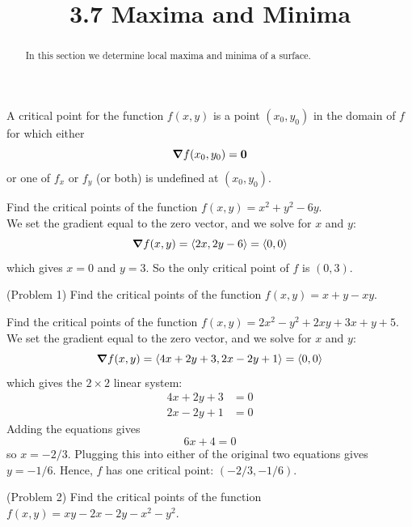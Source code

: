 \documentclass[handout]{ximera}
\title{3.7 Maxima and Minima}
\begin{document}
\begin{abstract}
In this section we determine local maxima and minima of a surface.
\end{abstract}

\maketitle

\begin{definition}
A critical point for the function $f(x,y)$ is a point $(x_0, y_0)$ in the domain of $f$ for which either
\[
\boldsymbol\nabla f(x_0, y_0) = \mathbf 0
\]
or one of $f_x$ or $f_y$ (or both) is undefined at $(x_0, y_0)$.
\end{definition}

\begin{example}[Example 1]
Find the critical points of the function $f(x,y) = x^2 + y^2 - 6y$.\\
We set the gradient equal to the zero vector, and we solve for $x$ and $y$:
\[
\boldsymbol\nabla f(x,y) = \left\langle 2x, 2y -6\right\rangle = \left\langle 0,0\right\rangle
\]
which gives $x = 0$ and $y = 3$.  So the only critical point of $f$ is $(0,3)$.
\end{example}

\begin{problem}(Problem 1)
Find the critical points of the function $f(x,y) = x+ y - xy$.
\end{problem}




\begin{example}[Example 2]
Find the critical points of the function $f(x,y) = 2x^2 - y^2 +2xy + 3x + y+ 5$.\\
We set the gradient equal to the zero vector, and we solve for $x$ and $y$:
\[
\boldsymbol\nabla f(x,y) = \left\langle 4x+2y + 3, 2x - 2y + 1\right\rangle = \left\langle 0,0\right\rangle
\]
which gives the $2 \times 2$ linear system:
\begin{align*}
4x+2y + 3 &= 0\\
2x -2y + 1 & = 0
\end{align*}
Adding the equations gives 
\[
6x + 4 = 0
\]
so $x = -2/3$. Plugging this into either of the original two equations gives $y = -1/6$.
Hence, $f$ has one critical point: $(-2/3, -1/6)$.
\end{example}

\begin{problem}(Problem 2)
Find the critical points of the function $f(x,y) = xy - 2x-2y-x^2 - y^2$.
\end{problem}
\end{document}
